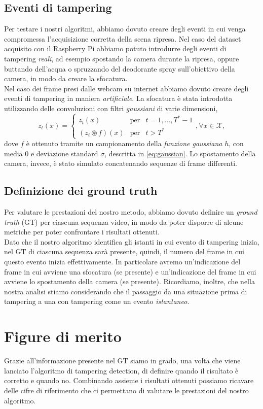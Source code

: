 \subsection{Eventi di tampering}
Per testare i nostri algoritmi, abbiamo dovuto creare degli eventi in cui venga compromessa l'acquisizione corretta della scena ripresa.
Nel caso del dataset acquisito con il Raspberry Pi abbiamo potuto introdurre degli eventi di tampering \textit{reali}, ad esempio spostando la camera durante la ripresa, oppure buttando dell'acqua o spruzzando del deodorante spray sull'obiettivo della camera, in modo da creare la sfocatura.\\
Nel caso dei frame presi dalle webcam su internet abbiamo dovuto creare degli eventi di tampering in maniera \textit{artificiale}.
La sfocatura \`e stata introdotta utilizzando delle convoluzioni con filtri \textit{gaussiani} di varie dimensioni,
\[z_t(x) = \left\{ \begin{array}{ccl}
z_t(x) & \mbox{per} & t=1,\dots,T^* -1 \\
(z_t \circledast f)(x) & \mbox{per} & t > T^* 
\end{array}\right. , \forall x \in \mathcal{X},\]
dove $f$ \`e ottenuto tramite un campionamento della \textit{funzione gaussiana} $h$, con media $0$ e deviazione standard $\sigma$, descritta in \eqref{eq:gaussian}.
Lo spostamento della camera, invece, \`e stato simulato concatenando sequenze di frame differenti.
\subsection{Definizione dei ground truth}
Per valutare le prestazioni del nostro metodo, abbiamo dovuto definire un \textit{ground truth} (GT) per ciascuna sequenza video, in modo da poter disporre di alcune metriche per poter confrontare i risultati ottenuti.\\
Dato che il nostro algoritmo identifica gli istanti in cui evento di tampering inizia, nel GT di ciascuna sequenza sar\`a presente, quindi, il numero del frame in cui questo evento inizia effettivamente. 
In particolare avremo un'indicazione del frame in cui avviene una sfocatura (se presente) e un'indicazione del frame in cui avviene lo spostamento della camera (se presente).
Ricordiamo, inoltre, che nella nostra analisi stiamo considerando che il passaggio da una situazione prima di tampering a una con tampering come un evento \textit{istantaneo}. 
\section{Figure di merito}
\label{figureDiMerito}
Grazie all'informazione presente nel GT siamo in grado, una volta che viene lanciato l'algoritmo di tampering detection, di definire quando il risultato \`e corretto e quando no.
Combinando assieme i risultati ottenuti possiamo ricavare delle cifre di riferimento che ci permettano di valutare le prestazioni del nostro algoritmo.
